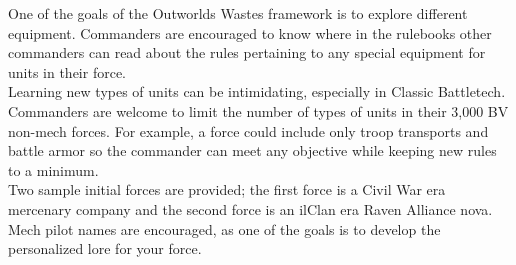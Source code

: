 \documentclass[UTF8]{article}
\begin{document}
One of the goals of the Outworlds Wastes framework is to explore different equipment.
Commanders are encouraged to know where in the rulebooks other commanders can read about the rules pertaining to any special equipment for units in their force.\\

Learning new types of units can be intimidating, especially in Classic Battletech.
Commanders are welcome to limit the number of types of units in their 3,000 BV non-mech forces.
For example, a force could include only troop transports and battle armor so the commander can meet any objective while keeping new rules to a minimum.\\

Two sample initial forces are provided; the first force is a Civil War era mercenary company and the second force is an ilClan era Raven Alliance nova.
Mech pilot names are encouraged, as one of the goals is to develop the personalized lore for your force.\\

\newpage
\end{document}
